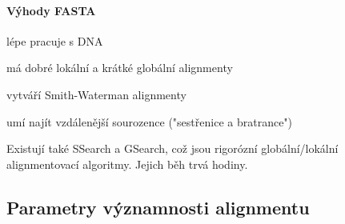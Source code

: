 \documentclass[DIV=8]{scrreprt}
\begin{document}
\paragraph{Výhody FASTA}
\begin{myItemize}[nosep]
    \item lépe pracuje s DNA
    \item má dobré lokální a krátké globální alignmenty
    \item vytváří Smith-Waterman alignmenty
    \item umí najít vzdálenější sourozence ("sestřenice a bratrance")
\end{myItemize}



Existují také SSearch a GSearch, což jsou rigorózní globální/lokální alignmentovací algoritmy. Jejich běh trvá hodiny.

\subsection{Parametry významnosti alignmentu} \label{Parametry významnosti alignmentu}
\end{document}
